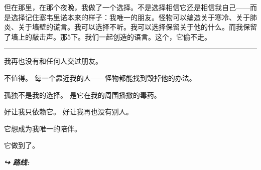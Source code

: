\noindent 但在那里，在那个夜晚，我做了一个选择。不是选择相信它还是相信我自己——而是选择记住塞韦里诺本来的样子：我唯一的朋友。怪物可以编造关于寒冷、关于肺炎、关于墙壁的谎言。我可以选择不听。我可以选择保留关于他的什么。而我保留了墙上的敲击声。那5下。我们一起创造的语言。这个，它偷不走。

\vspace{0.5em}\noindent\rule{\textwidth}{0.5pt}\vspace{0.5em}

\noindent 我再也没有和任何人交过朋友。

\noindent 不值得。
每一个靠近我的人——怪物都能找到毁掉他的办法。

\noindent 孤独不是我的选择。
是它在我的周围播撒的毒药。

\noindent 好让我只依赖它。
好让我再也没有别人。

\noindent 它想成为我唯一的陪伴。

\noindent 它做到了。

\vspace{0.5em}
\noindent\textit{\textbf{↪ 路线:}  \rotasep {}}
